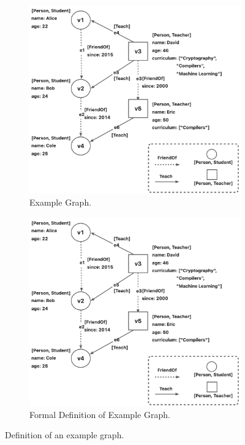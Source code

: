 \begin{figure}
    \centering
    \begin{subfigure}[b]{0.4\linewidth}
        \centering
        \includegraphics[width=\linewidth]{./figures/example-graph.png}
        \caption{Example Graph.}
        \label{fig:example-graph}
    \end{subfigure}
    \begin{subfigure}[b]{0.4\linewidth}
        \centering
        \includegraphics[width=\linewidth]{./figures/example-graph.png}
        \caption{Formal Definition of Example Graph.}
        \label{fig:example-graph-def}
    \end{subfigure}
    \caption{Definition of an example graph.}
    \label{fig:example-graph-full}
\end{figure}

